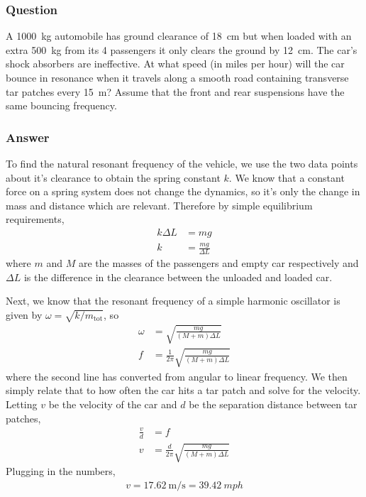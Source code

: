 \subsubsection{Question}

A \SI{1000}{\kg} automobile has ground clearance of \SI{18}{\cm} but when
loaded with an extra \SI{500}{\kg} from its 4 passengers it only clears the
ground by \SI{12}{\cm}. The car's shock absorbers are ineffective. At what
speed (in miles per hour) will the car bounce in resonance when it travels
along a smooth road containing transverse tar patches every \SI{15}{\m}?
Assume that the front and rear suspensions have the same bouncing frequency.

\subsubsection{Answer}

To find the natural resonant frequency of the vehicle, we use the two data
points about it's clearance to obtain the spring constant $k$. We know that
a constant force on a spring system does not change the dynamics, so it's
only the change in mass and distance which are relevant. Therefore by simple
equilibrium requirements,
\begin{align*}
    k ΔL &= mg \\
    k &= \frac{mg}{ΔL}
\end{align*}
where $m$ and $M$ are the masses of the passengers and empty car respectively
and $ΔL$ is the difference in the clearance between the unloaded and loaded
car.

Next, we know that the resonant frequency of a simple harmonic oscillator is
given by $ω = \sqrt{k/m_\mathrm{tot}}$, so
\begin{align*}
    ω &= \sqrt{\frac{mg}{(M+m)ΔL}} \\
    f &= \frac{1}{2π} \sqrt{\frac{mg}{(M+m)ΔL}}
\end{align*}
where the second line has converted from angular to linear frequency. We then
simply relate that to how often the car hits a tar patch and solve for the
velocity. Letting $v$ be the velocity of the car and $d$ be the separation
distance between tar patches,
\begin{align*}
    \frac{v}{d} &= f \\
    v &= \frac{d}{2π} \sqrt{\frac{mg}{(M+m)ΔL}}
\end{align*}
Plugging in the numbers,
\begin{align}
    \boxed{
    v = \SI{17.62}{\m\per\s} = \SI{39.42}{mph}
    }
\end{align}

